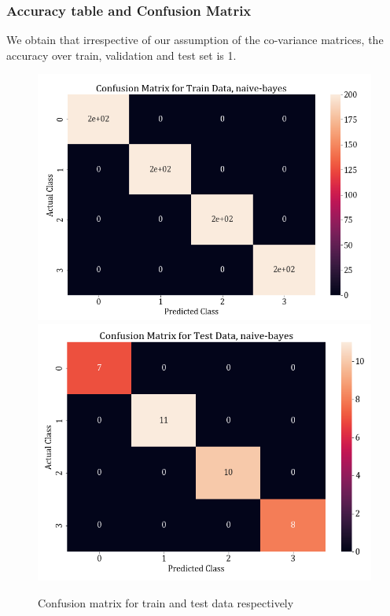 \documentclass[11pt,a4paper]{article}
\begin{document}
\subsubsection{Accuracy table and Confusion Matrix}
We obtain that irrespective of our assumption of the co-variance matrices, the accuracy over train, validation and test set is 1. 


\begin{figure}[H]
    \centering
    \includegraphics[scale=0.5]{images/1a_conf_mat_nb_train.png}
    \includegraphics[scale=0.5]{images/1a_conf_mat_nb_test.png}
    \caption{Confusion matrix for train and test data respectively}
    \label{fig:conf_mats}
\end{figure}
\end{document}
